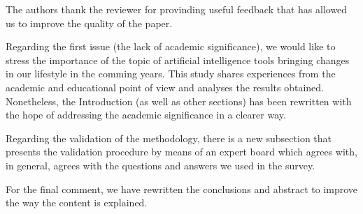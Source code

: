 \documentclass{letter}
\begin{document}
The authors thank the reviewer for provinding useful feedback that has allowed
us to improve the quality of the paper.

Regarding the first issue (the lack of academic significance), we would like to
stress the importance of the topic of artificial intelligence tools bringing
changes in our lifestyle in the comming years. This study shares experiences
from the academic and educational point of view and analyses the results
obtained. Nonetheless, the Introduction (as well as other sections) has been
rewritten with the hope of addressing the academic significance in a clearer
way.

Regarding the validation of the methodology, there is a new subsection that
presents the validation procedure by means of an expert board which agrees with,
in general, agrees with the questions and answers we used in the survey.

For the final comment, we have rewritten the conclusions and abstract to improve
the way the content is explained.
\end{document}
